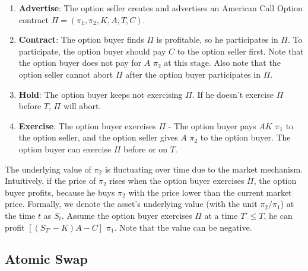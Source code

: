 \begin{enumerate}
    \item \textbf{Advertise}: The option seller creates and advertises an American Call Option contract $\Pi = (\pi_1, \pi_2, K, A, T, C)$.
    \item \textbf{Contract}: The option buyer finds $\Pi$ is profitable, so he participates in $\Pi$.
    To participate, the option buyer should pay $C$ to the option seller first.
    Note that the option buyer does not pay for $A$ $\pi_2$ at this stage.
    Also note that the option seller cannot abort $\Pi$ after the option buyer participates in $\Pi$.
    \item \textbf{Hold}: The option buyer keeps not exercising $\Pi$. If he doesn't exercise $\Pi$ before $T$, $\Pi$ will abort.
    \item \textbf{Exercise}: The option buyer exercises $\Pi$ - The option buyer pays $AK$ $\pi_1$ to the option seller, and the option seller gives $A$ $\pi_2$ to the option buyer. The option buyer can exercise $\Pi$ before or on $T$.
\end{enumerate}

The underlying value of $\pi_2$ is fluctuating over time due to the market mechanism.
Intuitively, if the price of $\pi_2$ rises when the option buyer exercises $\Pi$, the option buyer profits, because he buys $\pi_2$ with the price lower than the current market price.
Formally, we denote the asset's underlying value (with the unit $\pi_2 / \pi_1$) at the time $t$ as $S_t$.
Assume the option buyer exercises $\Pi$ at a time $T' \leq T$, he can profit $[(S_{T'} - K) A - C]$ $\pi_1$. 
Note that the value can be negative.










\subsection{Atomic Swap}

